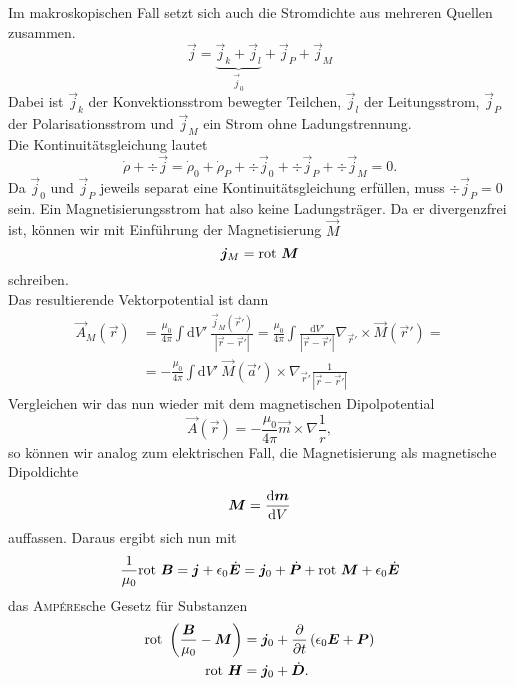Im makroskopischen Fall setzt sich auch die Stromdichte aus mehreren Quellen zusammen.
\begin{equation*}
\vec{j} = \underbrace{\vec{j}_k+\vec{j}_l}_{\vec{j}_0} + \vec{j}_P + \vec{j}_M
\end{equation*}
Dabei ist $\vec{j}_k$ der Konvektionsstrom bewegter Teilchen, $\vec{j}_l$ der Leitungsstrom, $\vec{j}_P$ der Polarisationsstrom und $\vec{j}_M$ ein Strom ohne Ladungstrennung. \\
Die Kontinuitätsgleichung lautet
\begin{equation*}
\dot{\rho}+\div\vec{j} = \dot{\rho}_0 + \dot{\rho}_P + \div\vec{j}_0 + \div\vec{j}_P + \div\vec{j}_M = 0.
\end{equation*}
Da $\vec{j}_0$ und $\vec{j}_P$ jeweils separat eine Kontinuitätsgleichung erfüllen, muss $\div\vec{j}_P=0$ sein. Ein Magnetisierungsstrom hat also keine Ladungsträger. Da er divergenzfrei ist, können wir mit Einführung der Magnetisierung $\vec{M}$
\begin{equation*}
\bm{j}_M  = \text{rot }\bm{M}
\end{equation*}
schreiben.\\
Das resultierende Vektorpotential ist dann
\begin{align*}
\vec{A}_M(\vec{r}) &= \frac{\mu_0}{4\pi}\int\mathrm{d}V'\  \frac{\vec{j}_M(\vec{r}')}{|\vec{r}-\vec{r}'|} = \frac{\mu_0}{4\pi}\int\frac{\mathrm{d}V'}{|\vec{r}-\vec{r}'|}\nabla_{\vec{r}'}\times\vec{M}(\vec{r}') = \\
&=-\frac{\mu_0}{4\pi}\int\mathrm{d}V'\ \vec{M}(\vec{a}')\times\nabla_{\vec{r}'}\frac{1}{|\vec{r}-\vec{r}'|}
\end{align*}
Vergleichen wir das nun wieder mit dem magnetischen Dipolpotential
\begin{equation*}
\vec{A}(\vec{r}) = -\frac{\mu_0}{4\pi}\vec{m}\times\nabla\frac{1}{r},
\end{equation*}
so können wir analog zum elektrischen Fall, die Magnetisierung als magnetische Dipoldichte
\begin{equation*}
\bm{M} = \frac{\mathrm{d}{\bm{m}}}{\mathrm{d}{V}}
\end{equation*}
auffassen. Daraus ergibt sich nun mit
\begin{equation*}
\frac{1}{\mu_0}\text{rot }\bm{B}=\bm{j} + \epsilon_0\dot{\bm{E}} = \bm{j}_0 + \dot{\bm{P}} + \text{rot }\bm{M} + \epsilon_0\dot{\bm{E}}
\end{equation*}
das \textsc{Ampére}sche Gesetz für Substanzen
\begin{align*}
\text{rot }\left(\frac{\bm{B}}{\mu_0}-\bm{M}\right) & = \bm{j}_0 + \frac{\partial{}}{\partial{t}}\left(\epsilon_0\bm{E}+\bm{P}\right)\\
\text{rot }\bm{H} &= \bm{j}_0 + \dot{\bm{D}}.
\end{align*}
